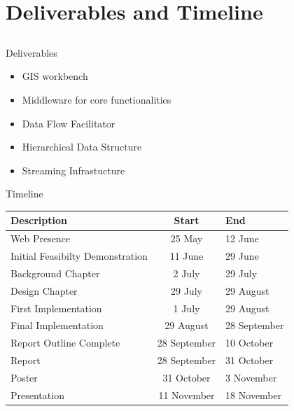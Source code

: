 \documentclass{beamer}
\begin{document}
\section{Deliverables and Timeline}
\subsection{}
\begin{frame}{Deliverables}

\begin{itemize}
\item GIS workbench
\item Middleware for core functionalities
\item Data Flow Facilitator
\item Hierarchical Data Structure
\item Streaming Infrastucture
\end{itemize}

\end{frame}

\begin{frame}{Timeline}


{\scriptsize
\begin{tabular}{l|c|l}
Description                      & Start             & End            \\
\hline \hline
Web Presence                     & 25 May            & 12 June        \\
\hline
Initial Feasibilty Demonstration & 11 June           & 29 June        \\
\hline
Background Chapter               & 2 July            & 29 July        \\
\hline
Design Chapter                   & 29 July           & 29 August      \\
\hline
First Implementation             & 1 July            & 29 August      \\
\hline
Final Implementation             & 29 August         & 28 September   \\
\hline
Report Outline Complete          & 28 September      & 10 October     \\
\hline
Report                           & 28 September      & 31 October     \\
\hline
Poster                           & 31 October        & 3 November     \\
\hline
Presentation                     & 11 November       & 18 November    \\
\end{tabular}}

\end{frame}
\end{document}
